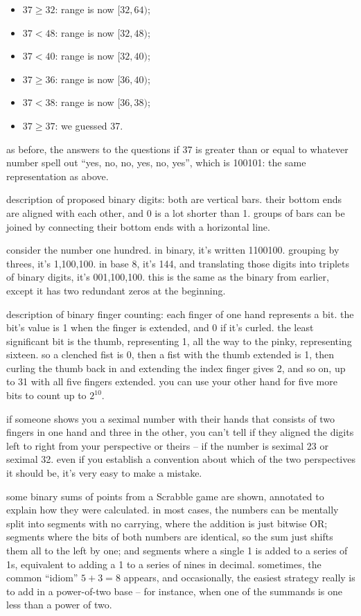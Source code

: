 \documentclass[../footnotes.tex]{subfiles}
\begin{document}
\begin{itemize}
	\item $37 \geq 32$: range is now $[32, 64)$;
	\item $37 <    48$: range is now $[32, 48)$;
	\item $37 <    40$: range is now $[32, 40)$;
	\item $37 \geq 36$: range is now $[36, 40)$;
	\item $37 <    38$: range is now $[36, 38)$;
	\item $37 \geq 37$: we guessed 37.
\end{itemize}

as before, the answers to the questions if 37 is greater than or equal to whatever number spell out ``yes, no, no, yes, no, yes'', which is 100101: the same representation as above.

 description of proposed binary digits: both are vertical bars. their bottom ends are aligned with each other, and 0 is a lot shorter than 1. groups of bars can be joined by connecting their bottom ends with a horizontal line.

 consider the number one hundred. in binary, it's written 1100100. grouping by threes, it's 1,100,100. in base 8, it's 144, and translating those digits into triplets of binary digits, it's 001,100,100. this is the same as the binary from earlier, except it has two redundant zeros at the beginning.

 description of binary finger counting: each finger of one hand represents a bit. the bit's value is 1 when the finger is extended, and 0 if it's curled. the least significant bit is the thumb, representing 1, all the way to the pinky, representing sixteen. so a clenched fist is 0, then a fist with the thumb extended is 1, then curling the thumb back in and extending the index finger gives 2, and so on, up to 31 with all five fingers extended. you can use your other hand for five more bits to count up to $2^{10}$.

 if someone shows you a seximal number with their hands that consists of two fingers in one hand and three in the other, you can't tell if they aligned the digits left to right from your perspective or theirs -- if the number is seximal 23 or seximal 32. even if you establish a convention about which of the two perspectives it should be, it's very easy to make a mistake.

 some binary sums of points from a Scrabble game are shown, annotated to explain how they were calculated. in most cases, the numbers can be mentally split into segments with no carrying, where the addition is just bitwise OR; segments where the bits of both numbers are identical, so the sum just shifts them all to the left by one; and segments where a single 1 is added to a series of 1s, equivalent to adding a 1 to a series of nines in decimal. sometimes, the common ``idiom'' $5 + 3 = 8$ appears, and occasionally, the easiest strategy really is to add in a power-of-two base -- for instance, when one of the summands is one less than a power of two.
\end{document}
